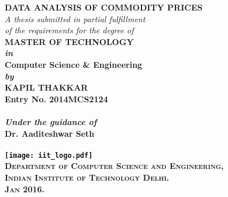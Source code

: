 \begin{titlepage}
\begin{center}

\LARGE{\textsf{\bfseries DATA ANALYSIS OF COMMODITY PRICES}}\\
\vspace{20pt}
\normalsize
\emph{A thesis submitted in partial fulfillment} \\
\emph{of the requirements for the degree of} \\
\vspace{20pt}
\bfseries MASTER OF TECHNOLOGY \\
\vspace{20pt}
\emph {in}\\
\vspace{20pt}
\bfseries Computer Science \& Engineering \\
\vspace{20pt}
\emph {by}\\
\vspace{20pt}
\Large{\textsf{\bfseries KAPIL THAKKAR}} \\
{\normalsize \textsf{\bfseries Entry No. 2014MCS2124}}\\
\ \\
{\normalsize \emph {Under the guidance of}}
\ \\
\Large{\textsf{\bfseries Dr. Aaditeshwar Seth}} \\
\ \\
\vspace{30pt}
\texttt{[image: iit\_logo.pdf]} \\
\vspace{10pt}
\large{\textsc{Department of Computer Science and Engineering,\\
Indian Institute of Technology Delhi.\\ Jan 2016.}}
\end{center}
\end{titlepage}
